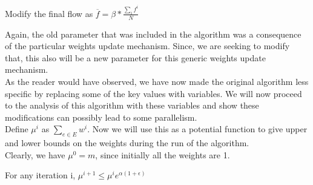 \documentclass[BTech]{iitmdiss}
\begin{document}
          \begin{modif}
	    Modify the final flow as $\overline{f} = \beta \ast \frac{\displaystyle\sum_{i}f^i}{N}$
          \end{modif}
  
	   Again, the old parameter that was included in the algorithm was a consequence of the particular weights update mechanism. Since, we are seeking
	   to modify that, this also will be a new parameter for this generic weights update mechanism. \\
	   
	   As the reader would have observed, we have now made the original algorithm less specific by replacing some of the 
	   key values with variables. We will now proceed to the analysis of this algorithm with these variables and show these modifications 
	   can possibly lead to some parallelism. \\
	   
	   Define $\mu^i$ as $\displaystyle\sum_{e \in E} w^i$. Now we will use this as a potential function to give upper and lower bounds on the 
	   weights during the run of the algorithm. \\
	   
	   Clearly, we have $\mu^0 = m$, since initially all the weights are 1. 
	   
	   \begin{thm}
	      For any iteration i,
		$\mu^{i+1} \leq \mu^i e^{\alpha (1+\epsilon) }$
	   \end{thm}
	   
\end{document}
